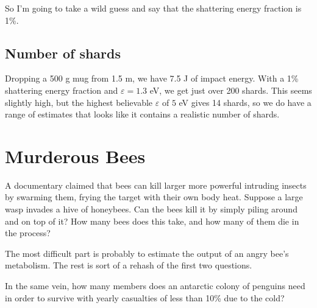 \documentclass[12pt]{article}
\begin{document}
So I'm going to take a wild guess and say that the shattering energy fraction is 1\%.

\subsection{Number of shards}

Dropping a 500 g mug from 1.5 m, we have 7.5 J of impact energy. With a 1\% shattering energy fraction and \(\varepsilon = 1.3\) eV, we get just over 200 shards. This seems slightly high, but the highest believable \(\varepsilon\) of \(5\) eV gives 14 shards, so we do have a range of estimates that looks like it contains a realistic number of shards.

\section{Murderous Bees}

A documentary claimed that bees can kill larger more powerful intruding insects by swarming them, frying the target with their own body heat. Suppose a large wasp invades a hive of honeybees. Can the bees kill it by simply piling around and on top of it? How many bees does this take, and how many of them die in the process?

The most difficult part is probably to estimate the output of an angry bee's metabolism. The rest is sort of a rehash of the first two questions.

In the same vein, how many members does an antarctic colony of penguins need in order to survive with yearly casualties of less than 10\% due to the cold?
\end{document}
